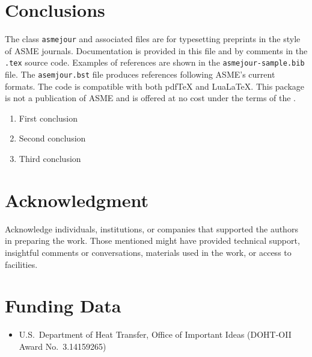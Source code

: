 \documentclass[balance,nocopyright,upint,varvw,hyphenate,barcolor=Goldenrod3,german]{asmejour}%
\newcommand*\pdfTeX{pdf\TeX}
\newcommand*\LuaLaTeX{Lua\LaTeX}
\begin{document}
\section{Conclusions}

The class \texttt{asmejour} and associated files are for typesetting preprints in the style of ASME journals.
Documentation is provided in this file and by comments in the \texttt{.tex} source code. Examples of references are shown in the \texttt{asmejour-sample.bib} file.  The \texttt{asemjour.bst} file produces references following ASME's current formats.  The code is compatible with both {\pdfTeX} and \LuaLaTeX. This package is not a publication of ASME and is offered at no cost under the terms of the . 

\begin{enumerate}
\item First conclusion
\item Second conclusion
\item Third conclusion 
\end{enumerate}


\section*{Acknowledgment} %

Acknowledge individuals, institutions, or companies that supported the authors in preparing the work. Those mentioned might have provided technical support, insightful comments or conversations, materials used in the work, or access to facilities.


\section*{Funding Data}

\begin{itemize}
\item U.S.\ Department of Heat Transfer, Office of Important Ideas (DOHT-OII Award No.\ 3.14159265)
\end{itemize}
\end{document}
